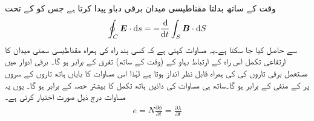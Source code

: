 وقت کے ساتھ بدلتا مقناطیسی میدان برقی دباو پیدا کرتا ہے جس کو   کے تحت
\begin{align*}
\oint_C\kvec{E}\cdot\dif s=-\frac{\dif}{\dif t}\int_S\kvec{B}\cdot\dif S
\end{align*}
 سے حاصل کیا جا سکتا ہے۔یہ مساوات کہتی ہے کہ کسی بند راہ کی ہمراہ مقناطیسی سمتی میدان  کا ارتفاعی تکمل اس راہ کے ارتباط بہاو کے  (وقت کے ساتھ) تفرق کے برابر ہو گا۔ برقی ادوار میں مستعمل برقی تاروں کی کی ہمراہ  قابل نظر انداز ہوتا ہے لہٰذا اس مساوات کا بایاں ہاتھ تاروں کے سروں پر    کے منفی کے برابر ہو گا۔ساتھ ہی مساوات کی دائیں ہاتھ تکمل کا بیشتر حصہ کے برابر ہو گا۔ یوں یہ مساوات درج ذیل صورت اختیار کرتی ہے۔ 
\begin{align}\label{مساوات_مقناطیسی_دور_فیراڈے_قانون}
e=N \frac{\partial \phi}{\partial t} =\frac{\partial \lambda}{\partial t}
\end{align}


